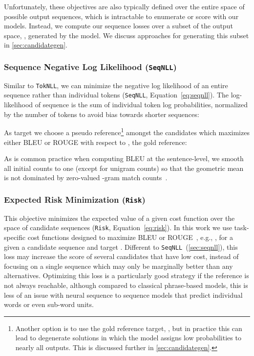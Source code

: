 \documentclass[11pt,a4paper]{article}
\newcommand{\TokNLL}{\texttt{TokNLL}}
\newcommand{\SeqNLL}{\texttt{SeqNLL}}
\newcommand{\Risk}{\texttt{Risk}}
\begin{document}
Unfortunately, these objectives are also typically defined over the entire space of possible output sequences, which is intractable to enumerate or score with our models.
Instead, we compute our sequence losses over a subset of the output space, , generated by the model.
We discuss approaches for generating this subset in \textsection\ref{sec:candidategen}.

\subsubsection*{Sequence Negative Log Likelihood (\SeqNLL)}
\label{sec:seqnll}

Similar to \TokNLL, we can minimize the negative log likelihood of an entire sequence rather than individual tokens (\SeqNLL, Equation~\ref{eq:seqnll}).
The log-likelihood of sequence  is the sum of individual token log probabilities, normalized by the number of tokens to avoid bias towards shorter sequences:

As target we choose a pseudo reference\footnote{Another option is to use the gold reference target, , but in practice this can lead to degenerate solutions in which the model assigns low probabilities to nearly all outputs. This is discussed further in \textsection\ref{sec:candidategen}.
} amongst the candidates which maximizes either
BLEU or ROUGE with respect to , the gold reference:

As is common practice when computing BLEU at the sentence-level, we smooth all initial counts to one (except for unigram counts) so that the geometric mean is not dominated by zero-valued -gram match counts~\citep{lin2004orange}.

\subsubsection*{Expected Risk Minimization (\Risk)}
\label{sec:risk}

This objective minimizes the expected value of a given cost function over the space of candidate sequences (\Risk, Equation~\ref{eq:risk}).
In this work we use task-specific cost functions designed to maximize BLEU or ROUGE~\citep{lin2004rouge}, e.g., , for a given a candidate sequence  and target .
Different to \SeqNLL~(\textsection\ref{sec:seqnll}), this loss may increase the score of several candidates that have low cost, instead of focusing on a single sequence which may only be marginally better than any alternatives.
Optimizing this loss is a particularly good strategy if the reference is not always reachable,
although compared to classical phrase-based models, this is less of an issue with neural sequence to sequence models that predict individual words or even sub-word units.
\end{document}
